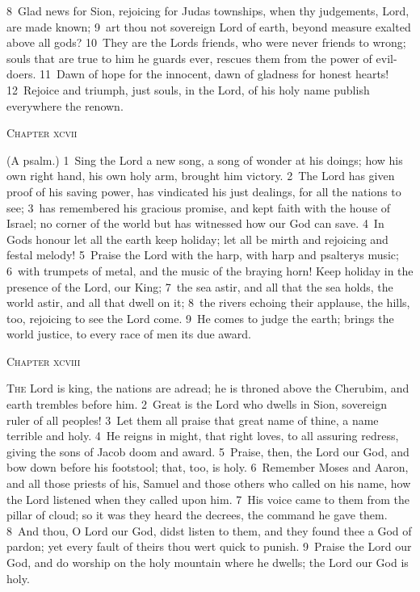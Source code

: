 \documentclass[10pt]{book} %
\begin{document}
\textcolor{benred8}{8}~Glad news for Sion, rejoicing for Juda\textquotesingle s townships, when thy judgements, Lord, are made known; \textcolor{benred8}{9}~art thou not sovereign Lord of earth, beyond measure exalted above all gods? \textcolor{benred8}{10}~They are the Lord\textquotesingle s friends, who were never friends to wrong; souls that are true to him he guards ever, rescues them from the power of evil-doers. \textcolor{benred8}{11}~Dawn of hope for the innocent, dawn of gladness for honest hearts! \textcolor{benred8}{12}~Rejoice and triumph, just souls, in the Lord, of his holy name publish everywhere the renown.
\begin{large}\begin{center}\textsc{Chapter xcvii}\end{center}\end{large}
(A psalm.)
\textcolor{benred8}{1}~Sing the Lord a new song, a song of wonder at his doings; how his own right hand, his own holy arm, brought him victory. \textcolor{benred8}{2}~The Lord has given proof of his saving power, has vindicated his just dealings, for all the nations to see; \textcolor{benred8}{3}~has remembered his gracious promise, and kept faith with the house of Israel; no corner of the world but has witnessed how our God can save. \textcolor{benred8}{4}~In God\textquotesingle s honour let all the earth keep holiday; let all be mirth and rejoicing and festal melody! \textcolor{benred8}{5}~Praise the Lord with the harp, with harp and psaltery\textquotesingle s music; \textcolor{benred8}{6}~with trumpets of metal, and the music of the braying horn! Keep holiday in the presence of the Lord, our King; \textcolor{benred8}{7}~the sea astir, and all that the sea holds, the world astir, and all that dwell on it; \textcolor{benred8}{8}~the rivers echoing their applause, the hills, too, rejoicing to see the Lord come. \textcolor{benred8}{9}~He comes to judge the earth; brings the world justice, to every race of men its due award.
\begin{large}\begin{center}\textsc{Chapter xcviii}\end{center}\end{large}
\lettrine[lines=2]{T}{he} Lord is king, the nations are adread; he is throned above the Cherubim, and earth trembles before him. \textcolor{benred8}{2}~Great is the Lord who dwells in Sion, sovereign ruler of all peoples! \textcolor{benred8}{3}~Let them all praise that great name of thine, a name terrible and holy. \textcolor{benred8}{4}~He reigns in might, that right loves, to all assuring redress, giving the sons of Jacob doom and award. \textcolor{benred8}{5}~Praise, then, the Lord our God, and bow down before his footstool; that, too, is holy. \textcolor{benred8}{6}~Remember Moses and Aaron, and all those priests of his, Samuel and those others who called on his name, how the Lord listened when they called upon him. \textcolor{benred8}{7}~His voice came to them from the pillar of cloud; so it was they heard the decrees, the command he gave them. \textcolor{benred8}{8}~And thou, O Lord our God, didst listen to them, and they found thee a God of pardon; yet every fault of theirs thou wert quick to punish. \textcolor{benred8}{9}~Praise the Lord our God, and do worship on the holy mountain where he dwells; the Lord our God is holy.
\end{document}
